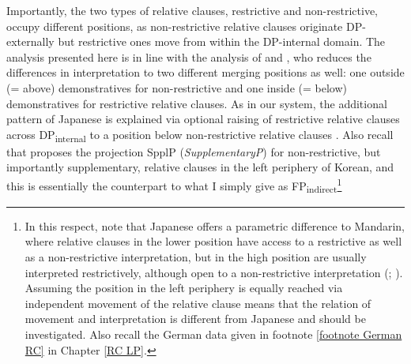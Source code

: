 \documentclass [output=book,colorlinks,citecolor=brown]{langscibook}
\begin{document}
Importantly, the two types of relative clauses, restrictive and non-restrictive, occupy different positions, as non-restrictive relative clauses originate DP-externally but restrictive ones move from within the DP-internal domain. The analysis presented here is in line with the analysis of \citet[223]{cinque:2020:relcl} and \citet{cinque:2008:two}, who reduces the differences in interpretation to two different merging positions as well: one outside (= above) demonstratives for non-restrictive and one inside (= below) demonstratives for restrictive relative clauses. As in our system, the additional pattern of Japanese is explained via optional raising of restrictive relative clauses across DP\textsubscript{internal} to a position below non-restrictive relative clauses \citep[116]{cinque:2008:two}. Also recall that \citet{kim:2019:syntax} proposes the projection SpplP (\textit{SupplementaryP}) for non-restrictive, but importantly supplementary, relative clauses in the left periphery of Korean, and this is essentially the counterpart to what I simply give as FP\textsubscript{indirect}\footnote{In this respect, note that Japanese offers a parametric difference to Mandarin, where relative clauses in the lower position have access to a restrictive as well as a non-restrictive interpretation, but in the high position are usually interpreted restrictively, although open to a non-restrictive interpretation (\citealt[235–236]{cinque:2020:relcl}; \citealt{hsu:2017:alternatives}). Assuming the position in the left periphery is equally reached via independent movement of the relative clause means that the relation of movement and interpretation is different from Japanese and should be investigated. Also recall the German data given in footnote \ref{footnote German RC} in Chapter \ref{RC LP}.} %
\end{document}

